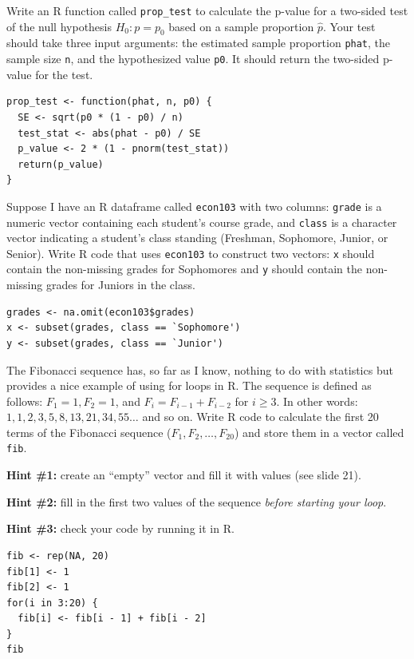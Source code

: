 \documentclass[addpoints,12pt]{exam}
\begin{document}
\begin{questions}
\question Write an R function called \texttt{prop\_test} to calculate the p-value for a two-sided test of the null hypothesis $H_0\colon p = p_0$ based on a sample proportion $\widehat{p}$. Your test should take three input arguments: the estimated sample proportion \texttt{phat}, the sample size \texttt{n}, and the hypothesized value \texttt{p0}.
It should return the two-sided p-value for the test.
\begin{solution}
\begin{verbatim}
prop_test <- function(phat, n, p0) {
  SE <- sqrt(p0 * (1 - p0) / n)
  test_stat <- abs(phat - p0) / SE 
  p_value <- 2 * (1 - pnorm(test_stat))
  return(p_value)
}
\end{verbatim}
\end{solution}

\question Suppose I have an R dataframe called \texttt{econ103} with two columns: \texttt{grade} is a numeric vector containing each student's course grade, and \texttt{class} is a character vector indicating a student's class standing (Freshman, Sophomore, Junior, or Senior).
Write R code that uses \texttt{econ103} to construct two vectors: \texttt{x} should contain the non-missing grades for Sophomores and \texttt{y} should contain the non-missing grades for Juniors in the class.
\begin{solution}
\begin{verbatim}
grades <- na.omit(econ103$grades)
x <- subset(grades, class == `Sophomore')
y <- subset(grades, class == `Junior') 
\end{verbatim}
\end{solution}

\question The Fibonacci sequence has, so far as I know, nothing to do with statistics but provides a nice example of using for loops in R. The sequence is defined as follows: $F_1 = 1, F_2 = 1$, and $F_i = F_{i-1} + F_{i-2}$ for $i \geq 3$. In other words: $1, 1, 2, 3, 5, 8, 13, 21, 34, 55\dots$ and so on.
Write R code to calculate the first 20 terms of the Fibonacci sequence ($F_1, F_2, \dots, F_{20}$) and store them in a vector called \texttt{fib}.

\textbf{Hint \#1:} create an ``empty'' vector and fill it with values (see slide 21). 

\textbf{Hint \#2:} fill in the first two values of the sequence \emph{before starting your loop}.

\textbf{Hint \#3:} check your code by running it in R.
\begin{solution}
  \begin{verbatim}
fib <- rep(NA, 20)
fib[1] <- 1
fib[2] <- 1
for(i in 3:20) {
  fib[i] <- fib[i - 1] + fib[i - 2]
}
fib
  \end{verbatim}
\end{solution}




\end{questions}
\end{document}

